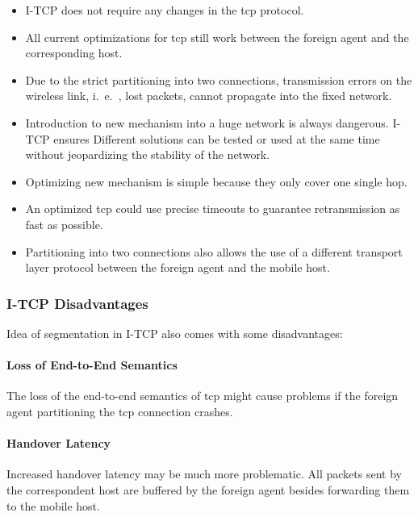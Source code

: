 \begin{itemize}
	\item I-TCP does not require any changes in the \gls{tcp} protocol.
	\item All current optimizations for \gls{tcp} still work between the foreign agent and the corresponding host.
	
	\item Due to the strict partitioning into two connections, transmission errors on the wireless link, i.\ e.\ , lost packets, cannot propagate into the fixed network.

    \item Introduction to new mechanism into a huge network is always dangerous. I-TCP ensures Different solutions can be tested or used at the same time without jeopardizing the stability of the network.
    
    \item Optimizing new mechanism is simple because they only cover one single hop.
    
	\item An optimized \gls{tcp} could use precise timeouts to guarantee retransmission as fast as possible. 
	
	\item Partitioning into two connections also allows the use of a different transport layer protocol between the foreign agent and the mobile host.
	
\end{itemize}

\subsubsection[Disadvantages]{I-TCP Disadvantages}
Idea of segmentation in I-TCP also comes with some disadvantages:

\paragraph*{Loss of End-to-End Semantics}
 The loss of the end-to-end semantics of \gls{tcp} might cause problems if the foreign agent partitioning the \gls{tcp} connection crashes.
 
 \paragraph*{Handover Latency}
 Increased handover latency may be much more problematic. All packets sent by the correspondent host are buffered by the foreign
 agent besides forwarding them to the mobile host.
 
